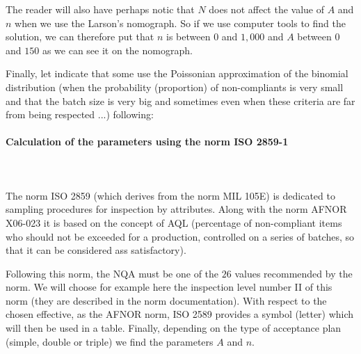 	The reader will also have perhaps notic that $N$ does not affect the value of $A$ and $n$ when we use the Larson's nomograph. So if we use computer tools to find the solution, we can therefore put that $n$ is between $0$ and $1,000$ and $A$ between $0$ and $150$ as we can see it on the nomograph.
	
	\begin{tcolorbox}[title=Remark,colframe=black,arc=10pt]
	Finally, let indicate that some use the Poissonian approximation of the binomial distribution (when the probability (proportion) of non-compliants is very small and that the batch size is very big and sometimes even when these criteria are far from being respected ...) following:
	
	\end{tcolorbox}
	
	\paragraph{Calculation of the parameters using the norm ISO 2859-1}\mbox{}\\\\
	The norm ISO 2859 (which derives from the norm MIL 105E) is dedicated to sampling procedures for inspection by attributes. Along with the norm AFNOR X06-023 it is based on the concept of AQL (percentage of non-compliant items who should not be exceeded for a production, controlled on a series of batches, so that it can be considered ass satisfactory).

	Following this norm, the NQA must be one of the $26$ values recommended by the norm. We will choose for example here the inspection level number II of this norm (they are described in the norm documentation). With respect to the chosen effective, as the AFNOR norm, ISO 2589 provides a symbol (letter) which will then be used in a table. Finally, depending on the type of acceptance plan (simple, double or triple) we find the parameters $A$ and $n$.
	
